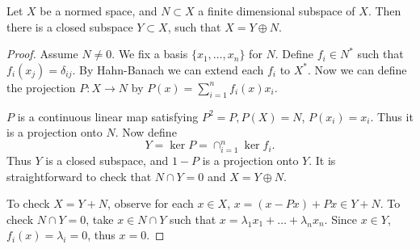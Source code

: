 \begin{lemma}
	\label{lem:FinDimComplement}
	Let $X $ be a normed space, and $N \subset X$ a finite dimensional subspace of $X$. Then there is a closed subspace $Y \subset X$, such that $X = Y \oplus N$.
\end{lemma}
\begin{proof}
	Assume $N \neq 0$. We fix a basis $\{x_1, \ldots, x_n\} $ for $N$. Define $f_i \in N^*$ such that $f_i(x_j) = \delta_{i j}$. By Hahn-Banach we can extend each $f_i$ to $X^*$. Now we can define the projection $P: X \to N$ by $P(x) = \sum _{i = 1}^n f_i(x) x_i$.

	$P$ is a continuous linear map satisfying $P^2 = P, P(X) = N$, $P(x_i) = x_i$. Thus it is a projection onto $N$. Now define
	\[
		Y = \operatorname{ker} P = \cap _{i = 1}^n \operatorname{ker} f_i
	.\] 
	Thus $Y$ is a closed subspace, and $1 - P$ is a projection onto $Y$. It is straightforward to check that $N \cap Y = 0$ and $X = Y \oplus N$.

	To check $X = Y + N$, observe for each $x \in X$, $x = (x - P x) + Px \in Y + N$. To check $N \cap Y = 0$, take $x \in N \cap Y$ such that $x = \lambda_1 x_1 + \ldots + \lambda_n x_n$. Since $x \in Y$, $f_i(x) = \lambda_i = 0$, thus $x = 0$.
\end{proof}




